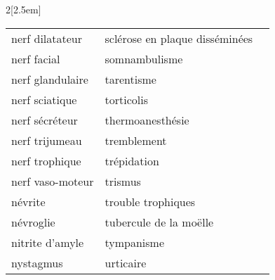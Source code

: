 \begin{multicols}{2}[\columnsep2.5em]
\begin{table}[H]
\begin{tabular}{l|l|l}
nerf dilatateur & sclérose en plaque disséminées & \\
nerf facial & somnambulisme & \\
nerf glandulaire &  tarentisme & \\
nerf sciatique & torticolis & \\
nerf sécréteur &  thermoanesthésie & \\
nerf trijumeau & tremblement & \\
nerf trophique & trépidation & \\
nerf vaso-moteur & trismus & \\
névrite & trouble trophiques & \\
névroglie &  tubercule de la moëlle & \\
nitrite d'amyle & tympanisme & \\
nystagmus & urticaire & \\
\end{tabular}
\end{table}
\columnbreak
\end{multicols}

